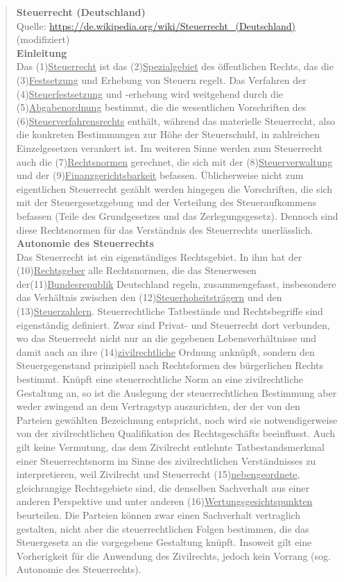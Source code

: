 \begin{quote}
  \textbf{Steuerrecht (Deutschland)}\\
  {\footnotesize Quelle: \url{https://de.wikipedia.org/wiki/Steuerrecht_(Deutschland)} (modifiziert)}\\

  \textbf{Einleitung}\\
  Das (1)\ul{Steuerrecht} ist das (2)\ul{Spezialgebiet} des öffentlichen Rechts, das die (3)\ul{Festsetzung} und Erhebung von Steuern regelt. Das Verfahren der (4)\ul{Steuerfestsetzung} und -erhebung wird weitgehend durch die (5)\ul{Abgabenordnung} bestimmt, die die wesentlichen Vorschriften des (6)\ul{Steuerverfahrensrechts} enthält, während das materielle Steuerrecht, also die konkreten Bestimmungen zur Höhe der Steuerschuld, in zahlreichen Einzelgesetzen verankert ist. Im weiteren Sinne werden zum Steuerrecht auch die (7)\ul{Rechtsnormen} gerechnet, die sich mit der (8)\ul{Steuerverwaltung} und der (9)\ul{Finanzgerichtsbarkeit} befassen. Üblicherweise nicht zum eigentlichen Steuerrecht gezählt werden hingegen die Vorschriften, die sich mit der Steuergesetzgebung und der Verteilung des Steueraufkommens befassen (Teile des Grundgesetzes und das Zerlegungsgesetz). Dennoch sind diese Rechtsnormen für das Verständnis des Steuerrechts unerlässlich.\\

  \textbf{Autonomie des Steuerrechts}\\
  Das Steuerrecht ist ein eigenständiges Rechtsgebiet. In ihm hat der (10)\ul{Rechtsgeber} alle Rechtsnormen, die das Steuerwesen der(11)\ul{Bundesrepublik} Deutschland regeln, zusammengefasst, insbesondere das Verhältnis zwischen den (12)\ul{Steuerhoheitsträgern} und den (13)\ul{Steuerzahlern}. Steuerrechtliche Tatbestände und Rechtsbegriffe sind eigenständig definiert. Zwar sind Privat- und Steuerrecht dort verbunden, wo das Steuerrecht nicht nur an die gegebenen Lebensverhältnisse und damit auch an ihre (14)\ul{zivilrechtliche} Ordnung anknüpft, sondern den Steuergegenstand prinzipiell nach Rechtsformen des bürgerlichen Rechts bestimmt. Knüpft eine steuerrechtliche Norm an eine zivilrechtliche Gestaltung an, so ist die Auslegung der steuerrechtlichen Bestimmung aber weder zwingend an dem Vertragstyp auszurichten, der der von den Parteien gewählten Bezeichnung entspricht, noch wird sie notwendigerweise von der zivilrechtlichen Qualifikation des Rechtsgeschäfts beeinflusst. Auch gilt keine Vermutung, das dem Zivilrecht entlehnte Tatbestandsmerkmal einer Steuerrechtsnorm im Sinne des zivilrechtlichen Verständnisses zu interpretieren, weil Zivilrecht und Steuerrecht (15)\ul{nebengeordnete}, gleichrangige Rechtsgebiete sind, die denselben Sachverhalt aus einer anderen Perspektive und unter anderen (16)\ul{Wertungsgesichtspunkten} beurteilen. Die Parteien können zwar einen Sachverhalt vertraglich gestalten, nicht aber die steuerrechtlichen Folgen bestimmen, die das Steuergesetz an die vorgegebene Gestaltung knüpft. Insoweit gilt eine Vorherigkeit für die Anwendung des Zivilrechts, jedoch kein Vorrang (sog. Autonomie des Steuerrechts).
\end{quote}

